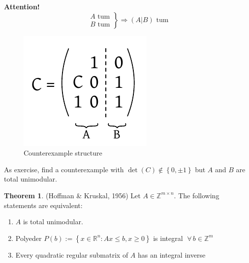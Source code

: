\documentclass[a4paper]{article}
\theoremstyle{definition}
\newtheorem{theorem}{Theorem}
\newcommand{\set}[1]{\left\{#1\right\}}
\newcommand{\fall}{\;\forall\,}
\begin{document}
\textbf{Attention!}
  \[
    \left.\begin{array}{c}
      A \text{ tum} \\
      B \text{ tum}
    \end{array}\right\} \Rightarrow (A | B) \text{ tum}
  \]
  \begin{figure}[!ht]
    \begin{center}
      \includegraphics{img/tum_counterexample.pdf}
      \caption{Counterexample structure}
    \end{center}
  \end{figure}
  As exercise, find a counterexample with $\det(C) \notin \set{0, \pm 1}$ but $A$ and $B$ are total unimodular.

\begin{theorem}\label{satz-7.1}
  (Hoffman \& Kruskal, 1956)
  Let $A \in \mathbb{Z}^{m \times n}$. The following statements are equivalent:
  \begin{enumerate}
    \item $A$ is total unimodular.
    \item Polyeder $P(b) := \set{x \in \mathbb{R}^n: Ax \leq b, x \geq 0}$ is integral $\fall b \in \mathbb{Z}^m$
    \item Every quadratic regular submatrix of $A$ has an integral inverse
  \end{enumerate}
\end{theorem}
\end{document}
